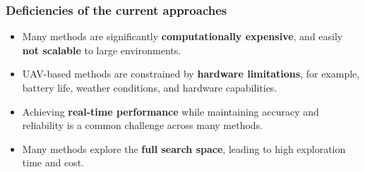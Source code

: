 \documentclass[aspectratio=169]{beamer}
\begin{document}
\begin{frame}
  \frametitle{Deficiencies of the current approaches}
  \begin{itemize}
    \item Many methods are significantly \textcolor{hbrsblue}{\textbf{computationally expensive}}, and easily \textcolor{hbrsblue}{\textbf{not scalable}} to large environments. \cite{zhu2024dual} \cite{hutchinson2017adaptive} \cite{ryan2010particle}
    \item UAV-based methods are constrained by \textcolor{hbrsblue}{\textbf{hardware limitations}}, for example, battery life, weather conditions, and hardware capabilities. \cite{connor2016airborne} \cite{woller2022path}
    \item Achieving \textcolor{hbrsblue}{\textbf{real-time performance}} while maintaining accuracy and reliability is a common challenge across many methods. \cite{zhu2024dual} \cite{ryan2010particle} \cite{woller2022path}
    \item Many methods explore the \textcolor{hbrsblue}{\textbf{full search space}}, leading to high exploration time and cost. \cite{woller2022path} \cite{connor2016airborne}
  \end{itemize}
  \end{frame}
\end{document}
